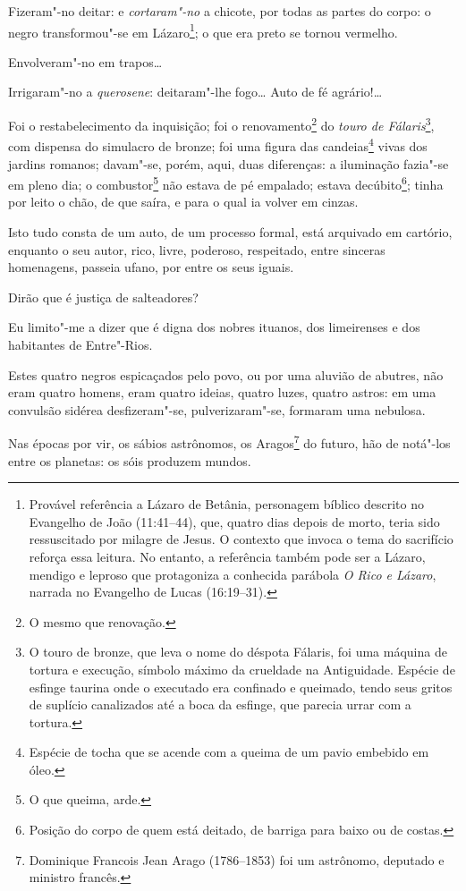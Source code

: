 Fizeram"-no deitar: e \emph{cortaram"-no} a chicote, por todas as partes
do corpo: o negro transformou"-se em Lázaro\footnote{Provável
  referência a Lázaro de Betânia, personagem bíblico descrito no
  Evangelho de João (11:41--44), que, quatro dias depois de morto, teria
  sido ressuscitado por milagre de Jesus. O contexto que invoca o tema
  do sacrifício reforça essa leitura. No entanto, a
  referência também pode ser a Lázaro, mendigo e leproso que protagoniza
  a conhecida parábola \emph{O Rico e Lázaro}, narrada no Evangelho de
  Lucas (16:19--31).}; o que era preto se tornou vermelho.

Envolveram"-no em trapos\ldots{}

Irrigaram"-no a \emph{querosene}: deitaram"-lhe fogo\ldots{} Auto de fé
agrário!\ldots{}

Foi o restabelecimento da inquisição; foi o renovamento\footnote{O
  mesmo que renovação.} do \emph{touro de Fálaris}\footnote{O touro de
  bronze, que leva o nome do déspota Fálaris, foi uma máquina de tortura
  e execução, símbolo máximo da crueldade na Antiguidade. Espécie de
  esfinge taurina onde o executado era confinado e queimado, tendo seus
  gritos de suplício canalizados até a boca da esfinge, que parecia
  urrar com a tortura.}, com dispensa do simulacro de bronze; foi uma
figura das candeias\footnote{Espécie de tocha que se acende com a
  queima de um pavio embebido em óleo.} vivas dos jardins romanos;
davam"-se, porém, aqui, duas diferenças: a iluminação fazia"-se em pleno
dia; o combustor\footnote{O que queima, arde.} não estava de pé
empalado; estava decúbito\footnote{Posição do corpo de quem está
  deitado, de barriga para baixo ou de costas.}; tinha por leito o chão,
de que saíra, e para o qual ia volver em cinzas.

Isto tudo consta de um auto, de um processo formal, está arquivado em
cartório, enquanto o seu autor, rico, livre, poderoso, respeitado, entre
sinceras homenagens, passeia ufano, por entre os seus iguais.

Dirão que é justiça de salteadores?

Eu limito"-me a dizer que é digna dos nobres ituanos, dos limeirenses e
dos habitantes de Entre"-Rios.

Estes quatro negros espicaçados pelo povo, ou por uma aluvião de
abutres, não eram quatro homens, eram quatro ideias, quatro luzes,
quatro astros: em uma convulsão sidérea desfizeram"-se, pulverizaram"-se,
formaram uma nebulosa.

Nas épocas por vir, os sábios astrônomos, os Aragos\footnote{Dominique
  Francois Jean Arago (1786--1853) foi um astrônomo, deputado e ministro
  francês.} do futuro, hão
de notá"-los entre os planetas: os sóis produzem mundos.

